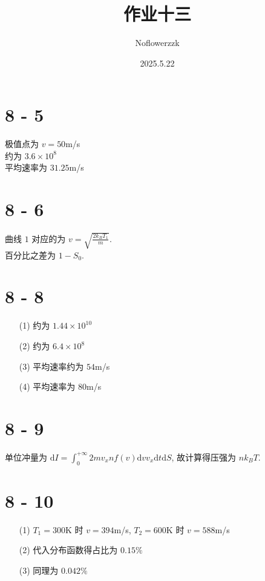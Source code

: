 \documentclass{article}
\title{作业十三}
\author{Noflowerzzk}
\date{2025.5.22}
\newcommand{\dd}{\mathrm{d}}
\begin{document}
\maketitle

\section*{8 - 5}

极值点为 $v = 50$m/s \\
约为 $3.6 \times 10^8$ \\
平均速率为 $31.25$m/s

\section*{8 - 6}

曲线 $1$ 对应的为 $v = \sqrt{\frac{2k_BT_1}{m}}$. \\
百分比之差为 $1 - S_0$.

\section*{8 - 8}

\begin{itemize}
    \item [(1)] 约为 $1.44 \times 10^{10}$
    \item [(2)] 约为 $6.4 \times 10^8$
    \item [(3)] 平均速率约为 $54$m/s
    \item [(4)] 平均速率为 $80$m/s
\end{itemize}

\section*{8 - 9}

单位冲量为 $\dd I = \int_{0}^{+\infty}2mv_x nf(v)\dd v v_x \dd t \dd S$, 故计算得压强为 $nk_BT$.

\section*{8 - 10}

\begin{itemize}
    \item [(1)] $T_1 = 300$K 时 $v = 394$m/s, $T_2 = 600$K 时 $v = 588$m/s
    \item [(2)] 代入分布函数得占比为 $0.15\%$
    \item [(3)] 同理为 $0.042\%$
\end{itemize}
\end{document}

